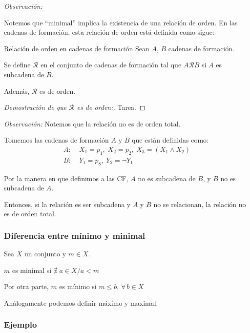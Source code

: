 \medskip
\textit{Observación:}

Notemos que ``minimal'' implica la existencia de una relación de orden. En las
cadenas de formación, esta relación de orden está definida como sigue:

\medskip

\begin{definicion}{Relación de orden en cadenas de formación}{}
Sean $A$, $B$ cadenas de formación.

\medskip

Se define $\mathcal{R}$ en el conjunto de cadenas de formación tal que
$A \mathcal{R} B$ si $A$ es subcadena de $B$.

Además, $\mathcal{R}$ es de orden.
\end{definicion}

\begin{proof}[Demostración de que $\mathcal{R}$ es de orden:] Tarea.
\end{proof}

\textit{Observación:}
Notemos que la relación no es de orden total.

Tomemos las cadenas de formación $A$ y $B$ que están definidas como:
\begin{align*}
    A:& \; X_1 = p_1, \; X_2 = p_2, \; X_3 = (X_1 \wedge X_2) \\
    B:& \; Y_1 = p_8, \; Y_2 = \neg Y_1
\end{align*}

Por la manera en que definimos a las CF, $A$ no es subcadena de $B$, y $B$ no 
es subcadena de $A$.

Entonces, si la relación es ser subcadena y $A$ y $B$ no se relacionan, la 
relación no es de orden total.


\subsubsection{Diferencia entre mínimo y minimal}

Sea $X$ un conjunto y $m \in X$.

$m$ es minimal si $\nexists \; a \in X / a < m$

Por otra parte, $m$ es mínimo si $m \leq b$, $\forall \, b \in X$

Análogamente podemos definir máximo y maximal.

\subsubsection{Ejemplo}

